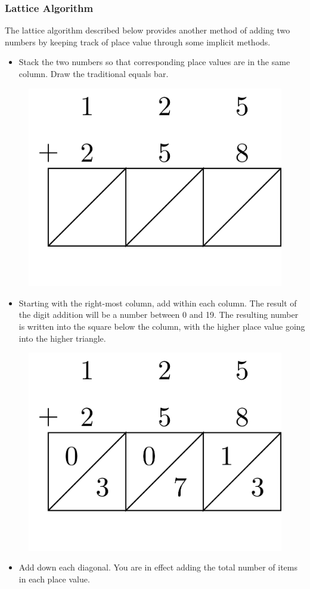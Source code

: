 \documentclass[
]{book}
\providecommand{\tightlist}{%
  \setlength{\itemsep}{0pt}\setlength{\parskip}{0pt}}
\theoremstyle{definition}
\theoremstyle{definition}
\theoremstyle{definition}
\theoremstyle{definition}
\theoremstyle{remark}
\begin{document}
\hypertarget{lattice-algorithm}{%
\subsubsection*{Lattice Algorithm}\label{lattice-algorithm}}

The lattice algorithm described below provides another method of adding two numbers by keeping track of place value through some implicit methods.

\begin{itemize}
\tightlist
\item
  Stack the two numbers so that corresponding place values are in the same column. Draw the traditional equals bar.
\end{itemize}

\begin{figure}

{\centering \includegraphics[width=0.2\linewidth]{tikz/lattice-addition1} 

}

\end{figure}

\begin{itemize}
\tightlist
\item
  Starting with the right-most column, add within each column. The result of the digit addition will be a number between 0 and 19. The resulting number is written into the square below the column, with the higher place value going into the higher triangle.
\end{itemize}

\begin{figure}

{\centering \includegraphics[width=0.2\linewidth]{tikz/lattice-addition2} 

}

\end{figure}

\begin{itemize}
\tightlist
\item
  Add down each diagonal. You are in effect adding the total number of items in each place value.
\end{itemize}
\end{document}
